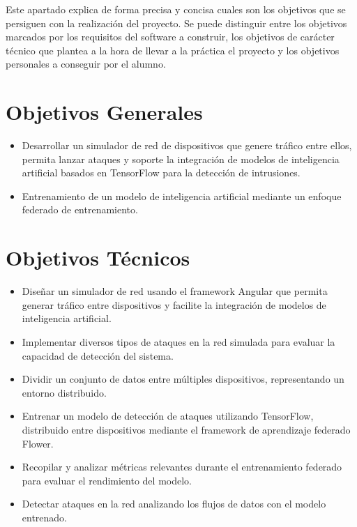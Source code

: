 
Este apartado explica de forma precisa y concisa cuales son los objetivos que se persiguen con la realización del proyecto. Se puede distinguir entre los objetivos marcados por los requisitos del software a construir, los objetivos de carácter técnico que plantea a la hora de llevar a la práctica el proyecto y los objetivos personales a conseguir por el alumno.

\section{Objetivos Generales}
\begin{itemize}
    \item Desarrollar un simulador de red de dispositivos que genere tráfico entre ellos, permita lanzar ataques y soporte la integración de modelos de inteligencia artificial basados en TensorFlow para la detección de intrusiones.
    \item Entrenamiento de un modelo de inteligencia artificial mediante un enfoque federado de entrenamiento.
\end{itemize}

\section{Objetivos Técnicos}
\begin{itemize}
    \item Diseñar un simulador de red usando el framework Angular que permita generar tráfico entre dispositivos y facilite la integración de modelos de inteligencia artificial.
    \item Implementar diversos tipos de ataques en la red simulada para evaluar la capacidad de detección del sistema.
    \item Dividir un conjunto de datos entre múltiples dispositivos, representando un entorno distribuido.
    \item Entrenar un modelo de detección de ataques utilizando TensorFlow, distribuido entre dispositivos mediante el framework de aprendizaje federado Flower.
    \item Recopilar y analizar métricas relevantes durante el entrenamiento federado para evaluar el rendimiento del modelo.
    \item Detectar ataques en la red analizando los flujos de datos con el modelo entrenado.
\end{itemize}

